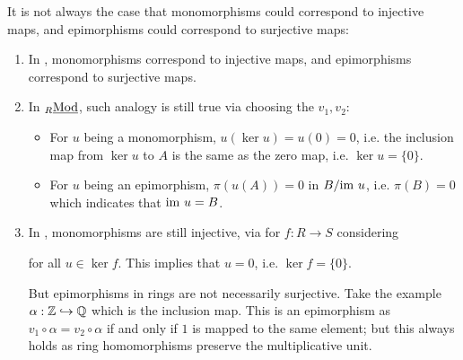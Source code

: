 \begin{example}
    It is not always the case that monomorphisms could correspond to injective maps, and epimorphisms could correspond to surjective maps:
    \begin{enumerate}
        \item In \catsets, monomorphisms correspond to injective maps, and epimorphisms correspond to surjective maps.
        \item In ${}_{R}\underline{\textup{Mod}}$, such analogy is still true via choosing the $v_1, v_2$:
        \begin{figure}[htbp]
            \centering
            \begin{minipage}{0.48\linewidth}
                \centering
            \end{minipage}
            \begin{minipage}{0.48\linewidth}
                \centering
            \end{minipage}
        \end{figure}
        \begin{itemize}
            \item For $u$ being a monomorphism, $u(\ker u) = u(0) = 0$, i.e. the inclusion map from $\ker u$ to $A$ is the same as the zero map, i.e. $\ker u = \{0\}$. 
            \item For $u$ being an epimorphism, $\pi(u(A)) = 0$ in $B / \mathrm{im}\  u$, i.e. $\pi(B) = 0$ which indicates that $\mathrm{im}\  u = B$.
        \end{itemize}
        \item In \catrings, monomorphisms are still injective, via for $f: R\to S$ considering
        for all $u \in \ker f$. This implies that $u = 0$, i.e. $\ker f = \{0\}$.

        But epimorphisms in rings are not necessarily surjective. Take the example $\alpha: \mathbb{Z} \hookrightarrow \mathbb{Q}$ which is the inclusion map. This is an epimorphism as $v_1 \circ \alpha = v_2 \circ \alpha$ if and only if $1$ is mapped to the same element; but this always holds as ring homomorphisms preserve the multiplicative unit. 
    \end{enumerate}
\end{example}

